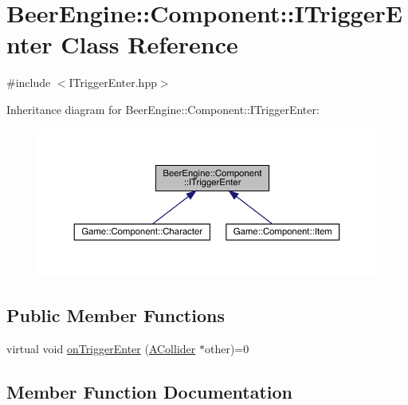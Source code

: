 \hypertarget{class_beer_engine_1_1_component_1_1_i_trigger_enter}{}\section{Beer\+Engine\+:\+:Component\+:\+:I\+Trigger\+Enter Class Reference}
\label{class_beer_engine_1_1_component_1_1_i_trigger_enter}


{\ttfamily \#include $<$I\+Trigger\+Enter.\+hpp$>$}



Inheritance diagram for Beer\+Engine\+:\+:Component\+:\+:I\+Trigger\+Enter\+:
\nopagebreak
\begin{figure}[H]
\begin{center}
\leavevmode
\includegraphics[width=350pt]{class_beer_engine_1_1_component_1_1_i_trigger_enter__inherit__graph}
\end{center}
\end{figure}
\subsection*{Public Member Functions}
\begin{DoxyCompactItemize}
\item 
virtual void \mbox{\hyperlink{class_beer_engine_1_1_component_1_1_i_trigger_enter_aab0d007cc2a256bc5aa542cd7dfdeef0}{on\+Trigger\+Enter}} (\mbox{\hyperlink{class_beer_engine_1_1_component_1_1_a_collider}{A\+Collider}} $\ast$other)=0
\end{DoxyCompactItemize}


\subsection{Member Function Documentation}
\mbox{\label{class_beer_engine_1_1_component_1_1_i_trigger_enter_aab0d007cc2a256bc5aa542cd7dfdeef0}} 
